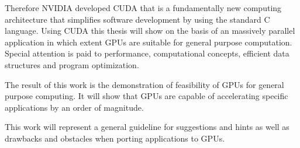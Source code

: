 Therefore NVIDIA developed \gls{CUDA} that is a fundamentally new computing
architecture that simplifies software development by using the standard C
language. Using \gls{CUDA} this thesis will show on the basis of an massively
parallel application in which extent \glspl{GPU} are suitable for general
purpose computation. Special attention is paid to performance, computational
concepts, efficient data structures and program optimization.

The result of this work is the demonstration of feasibility of \glspl{GPU} for
general purpose computing. It will show that \glspl{GPU} are capable of
accelerating specific applications by an order of magnitude.

This work will represent a general guideline for suggestions and hints as 
well as drawbacks and obstacles when porting applications to GPUs.

\endgroup			

\vfill